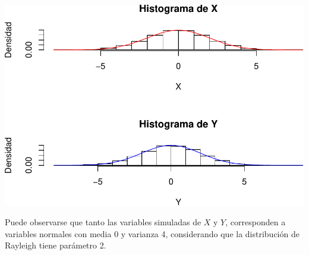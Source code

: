 \documentclass[]{article}
\begin{document}
\includegraphics{notebook_simulaciones_files/figure-latex/unnamed-chunk-12-1.pdf}

Puede observarse que tanto las variables simuladas de \(X\) y \(Y\),
corresponden a variables normales con media 0 y varianza 4, considerando
que la distribución de Rayleigh tiene parámetro 2.
\end{document}
